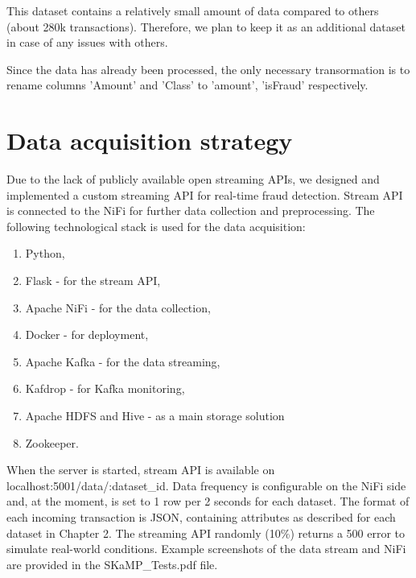 \documentclass[12pt,a4paper, hidelinks]{article}
\begin{document}
This dataset contains a relatively small amount of data compared to others (about 280k transactions). Therefore, we plan to keep it as an additional dataset in case of any issues with others.

Since the data has already been processed, the only necessary transormation is to rename columns 'Amount' and 'Class' to 'amount', 'isFraud' respectively.

\newpage

\section{Data acquisition strategy}

Due to the lack of publicly available open streaming APIs, we designed and implemented a custom streaming API for real-time fraud detection. Stream API is connected to the NiFi for further data collection and preprocessing. The following technological stack is used for the data acquisition:

\begin{enumerate}
    \item Python,
    \item Flask  - for the stream API,
    \item Apache NiFi - for the data collection,
    \item Docker - for deployment,
    \item Apache Kafka - for the data streaming,
    \item Kafdrop - for Kafka monitoring,
    \item Apache HDFS and Hive - as a main storage solution
    \item Zookeeper.
\end{enumerate}

When the server is started, stream API is available on localhost:5001/data/:dataset\_id. Data frequency is configurable on the NiFi side and, at the moment, is set to 1 row per 2 seconds for each dataset. The format of each incoming transaction is JSON, containing attributes as described for each dataset in Chapter 2. The streaming API randomly (10\%) returns a 500 error to simulate real-world conditions. Example screenshots of the data stream and NiFi are provided in the SKaMP\_Tests.pdf file.
\end{document}
